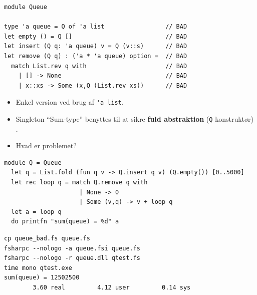 \documentclass[rgb]{beamer}
\begin{document}
\begin{frame}[fragile]
\begin{footnotesize}


  \vspace{1ex}

\begin{lstlisting}[numbers=none,frame=none,mathescape]
module Queue

type 'a queue = Q of 'a list                 // BAD
let empty () = Q []                          // BAD
let insert (Q q: 'a queue) v = Q (v::s)      // BAD
let remove (Q q) : ('a * 'a queue) option =  // BAD
  match List.rev q with                      // BAD
    | [] -> None                             // BAD
    | x::xs -> Some (x,Q (List.rev xs))      // BAD
\end{lstlisting}

  \vspace{1ex}
\begin{itemize}
\item Enkel version ved brug af \lstinline{'a list}.
\item Singleton ``Sum-type'' benyttes til at sikre \textbf{fuld abstraktion} (\lstinline{Q} konstruktør) .
\end{itemize}

  \vspace{1ex}
  \begin{itemize}
  \item Hvad er problemet?
\end{itemize}

\end{footnotesize}
\end{frame}

\begin{frame}[fragile]
\begin{footnotesize}


  \vspace{1ex}

\begin{lstlisting}[numbers=none,frame=none,mathescape]
  module Q = Queue
  let q = List.fold (fun q v -> Q.insert q v) (Q.empty()) [0..5000]
  let rec loop q = match Q.remove q with
                     | None -> 0
                     | Some (v,q) -> v + loop q
  let a = loop q
  do printfn "sum(queue) = %d" a
\end{lstlisting}

  \vspace{1ex}

\begin{verbatim}
cp queue_bad.fs queue.fs
fsharpc --nologo -a queue.fsi queue.fs
fsharpc --nologo -r queue.dll qtest.fs
time mono qtest.exe
sum(queue) = 12502500
        3.60 real         4.12 user         0.14 sys
\end{verbatim}
\end{footnotesize}
\end{frame}
\end{document}
